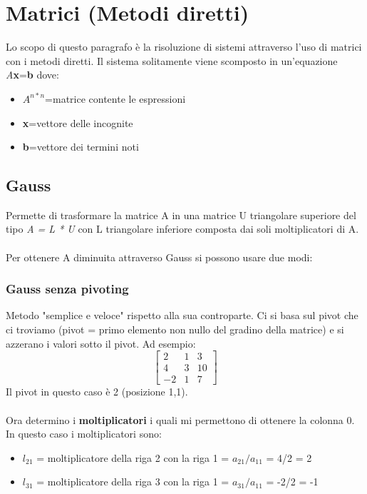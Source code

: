 \section{Matrici (Metodi diretti)}
\label{Matrici (Metodi diretti)}

Lo scopo di questo paragrafo è la risoluzione di sistemi attraverso l'uso di matrici con i metodi diretti. Il sistema solitamente viene scomposto in un'equazione \textit{A}\textbf{x}=\textbf{b} dove:
\begin{itemize}
\item $A^{n*n}$=matrice contente le espressioni
\item \textbf{x}=vettore delle incognite
\item \textbf{b}=vettore dei termini noti
\end{itemize}


\subsection{Gauss}
\label{Gauss}
Permette di trasformare la matrice A in una matrice U triangolare superiore del tipo \textit{A = L * U} con L triangolare inferiore composta dai soli moltiplicatori di A.
\\
\\
Per ottenere A diminuita attraverso Gauss si possono usare due modi:
\subsubsection{Gauss senza pivoting}
\label{Gauss senza pivoting}
Metodo "semplice e veloce" rispetto alla sua controparte. Ci si basa sul pivot che ci troviamo (pivot = primo elemento non nullo del gradino della matrice) e si azzerano i valori sotto il pivot. Ad esempio:
$$
\begin{bmatrix}
2 & 1 & 3 \\
4 & 3 & 10 \\
-2 & 1 & 7 
\end{bmatrix}
$$
\noindent
Il pivot in questo caso è 2 (posizione 1,1).
\\
\\
Ora determino i \textbf{moltiplicatori} i quali mi permettono di ottenere la colonna 0. In questo caso i moltiplicatori sono:
\begin{itemize}
\item $l_{21}$ = moltiplicatore della riga 2 con la riga 1 = $a_{21}/a_{11}$ = 4/2 = 2
\item $l_{31}$ = moltiplicatore della riga 3 con la riga 1 = $a_{31}/a_{11}$ = -2/2 = -1
\end{itemize}

